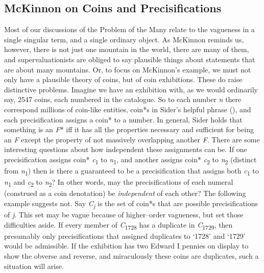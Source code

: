 \documentclass[
  11pt,
  letterpaper,
  DIV=11,
  numbers=noendperiod,
  oneside]{scrartcl}
\begin{document}
\subsection{McKinnon on Coins and
Precisifications}\label{mckinnon-on-coins-and-precisifications}

Most of our discussions of the Problem of the Many relate to the
vagueness in a single singular term, and a single ordinary object. As
McKinnon reminds us, however, there is not just one mountain in the
world, there are many of them, and supervaluationists are obliged to say
plausible things about statements that are about many mountains. Or, to
focus on McKinnon's example, we must not only have a plausible theory of
coins, but of coin exhibitions. These do raise distinctive problems.
Imagine we have an exhibition with, as we would ordinarily say, 2547
coins, each numbered in the catalogue. So to each number \emph{n} there
correspond millions of coin-like entities, coin*s in Sider's helpful
phrase (), and each precisification
assigns a coin* to a number. In general, Sider holds that something is
an \emph{F}* iff it has all the properties necessary and sufficient for
being an \emph{F} except the property of not massively overlapping
another \emph{F}. There are some interesting questions about how
independent these assignments can be. If one precisification assigns
coin* \emph{c}\textsubscript{1} to \emph{n}\textsubscript{1}, and
another assigns coin* \emph{c}\textsubscript{2} to
\emph{n}\textsubscript{2} (distinct from \emph{n}\textsubscript{1}) then
is there a guaranteed to be a precisification that assigns both
\emph{c}\textsubscript{1} to \emph{n}\textsubscript{1} and
\emph{c}\textsubscript{2} to \emph{n}\textsubscript{2}? In other words,
may the precisifications of each numeral (construed as a coin
denotation) be \emph{independent} of each other? The following example
suggests not. Say \emph{C\textsubscript{j}} is the set of coin*s that
are possible precisifications of \emph{j}. This set may be vague because
of higher--order vagueness, but set those difficulties aside. If every
member of \emph{C}\textsubscript{1728} has a duplicate in
\emph{C}\textsubscript{1729}, then presumably only precisifications that
assigned duplicates to `1728' and `1729' would be admissible. If the
exhibition has two Edward I pennies on display to show the obverse and
reverse, and miraculously these coins are duplicates, such a situation
will arise.
\end{document}
